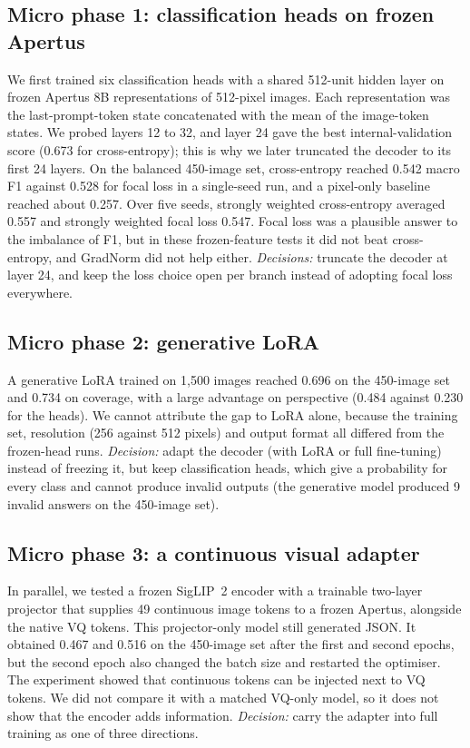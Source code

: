 \documentclass[11pt]{article}
\begin{document}
\subsection{Micro phase 1: classification heads on frozen Apertus}
We first trained six classification heads with a shared 512-unit hidden layer on frozen Apertus 8B representations of 512-pixel images. Each representation was the last-prompt-token state concatenated with the mean of the image-token states. We probed layers 12 to 32, and layer 24 gave the best internal-validation score (0.673 for cross-entropy); this is why we later truncated the decoder to its first 24 layers. On the balanced 450-image set, cross-entropy reached 0.542 macro F1 against 0.528 for focal loss \cite{focal} in a single-seed run, and a pixel-only baseline reached about 0.257. Over five seeds, strongly weighted cross-entropy averaged 0.557 and strongly weighted focal loss 0.547. Focal loss was a plausible answer to the imbalance of F1, but in these frozen-feature tests it did not beat cross-entropy, and GradNorm did not help either. \emph{Decisions:} truncate the decoder at layer 24, and keep the loss choice open per branch instead of adopting focal loss everywhere.

\subsection{Micro phase 2: generative LoRA}
A generative LoRA \cite{lora_paper} trained on 1,500 images reached 0.696 on the 450-image set and 0.734 on coverage, with a large advantage on perspective (0.484 against 0.230 for the heads). We cannot attribute the gap to LoRA alone, because the training set, resolution (256 against 512 pixels) and output format all differed from the frozen-head runs. \emph{Decision:} adapt the decoder (with LoRA or full fine-tuning) instead of freezing it, but keep classification heads, which give a probability for every class and cannot produce invalid outputs (the generative model produced 9 invalid answers on the 450-image set).

\subsection{Micro phase 3: a continuous visual adapter}
In parallel, we tested a frozen SigLIP~2 encoder \cite{siglip2} with a trainable two-layer projector that supplies 49 continuous image tokens to a frozen Apertus, alongside the native VQ tokens. This projector-only model still generated JSON. It obtained 0.467 and 0.516 on the 450-image set after the first and second epochs, but the second epoch also changed the batch size and restarted the optimiser. The experiment showed that continuous tokens can be injected next to VQ tokens. We did not compare it with a matched VQ-only model, so it does not show that the encoder adds information. \emph{Decision:} carry the adapter into full training as one of three directions.
\end{document}
